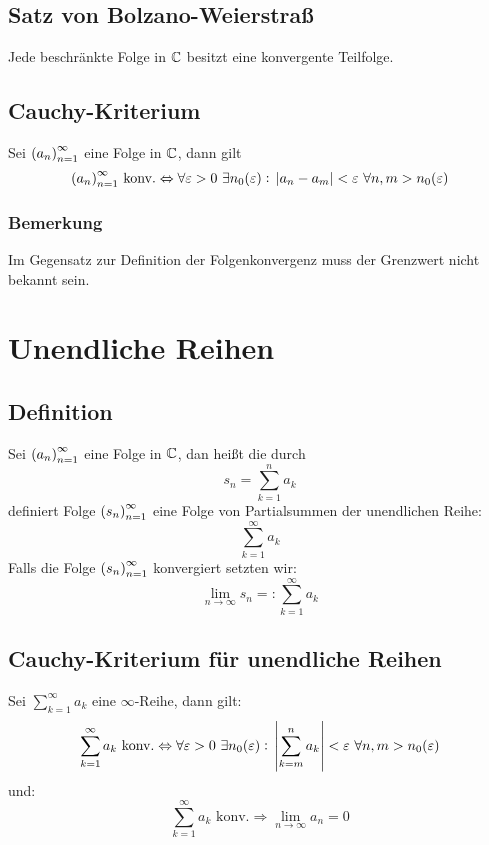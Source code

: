 \subsection{Satz von Bolzano-Weierstraß}
Jede beschränkte Folge in $\mathbb{C}$ besitzt eine konvergente Teilfolge.

\subsection{Cauchy-Kriterium}
Sei ${(a_n)}_{n=1}^\infty$ eine Folge in $\mathbb{C}$, dann gilt
\begin{equation*}
    {(a_n)}_{n=1}^\infty \text{ konv.} \Leftrightarrow
    \forall \varepsilon > 0\ \exists n_0(\varepsilon):\
    \abs{a_n - a_m} < \varepsilon\ \forall n,m > n_0(\varepsilon)
\end{equation*}
\subsubsection{Bemerkung} Im Gegensatz zur Definition der Folgenkonvergenz muss der
Grenzwert nicht bekannt sein.

\section{Unendliche Reihen}
\subsection{Definition}
Sei ${(a_n)}_{n=1}^\infty$ eine Folge in $\mathbb{C}$, dan  heißt die durch
\begin{equation*}
    s_n = \sum_{k=1}^n a_k
\end{equation*}
definiert Folge ${(s_n)}_{n=1}^\infty$ eine Folge von Partialsummen der
unendlichen Reihe:
\begin{equation*}
    \sum_{k=1}^\infty a_k
\end{equation*}
Falls die Folge ${(s_n)}_{n=1}^\infty$ konvergiert setzten wir:
\begin{equation*}
    \lim_{n \rightarrow \infty} s_n =: \sum_{k=1}^\infty a_k
\end{equation*}

\subsection{Cauchy-Kriterium für unendliche Reihen}
Sei $\sum_{k=1}^\infty a_k$ eine $\infty$-Reihe, dann gilt:
\begin{equation*}
    \sum_{k=1}^\infty a_k \text{ konv.} \Leftrightarrow
    \forall \varepsilon > 0\ \exists n_0(\varepsilon):\
    \abs{\sum_{k=m}^n a_k} < \varepsilon\
    \forall n, m>n_0(\varepsilon)
\end{equation*}
und:
\begin{equation*}
    \sum_{k=1}^\infty a_k \text{ konv.} \Rightarrow
    \lim_{n \rightarrow \infty} a_n = 0
\end{equation*}

